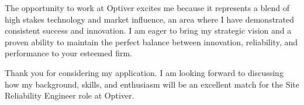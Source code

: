 \documentclass[11pt, a4paper]{awesome-cv}
\begin{document}
\begin{cvletter}
The opportunity to work at Optiver excites me because it represents a blend of high stakes technology and market influence, an area where I have demonstrated consistent success and innovation. I am eager to bring my strategic vision and a proven ability to maintain the perfect balance between innovation, reliability, and performance to your esteemed firm.

Thank you for considering my application. I am looking forward to discussing how my background, skills, and enthusiasm will be an excellent match for the Site Reliability Engineer role at Optiver.
\end{cvletter}

\makeletterclosing
\end{document}
